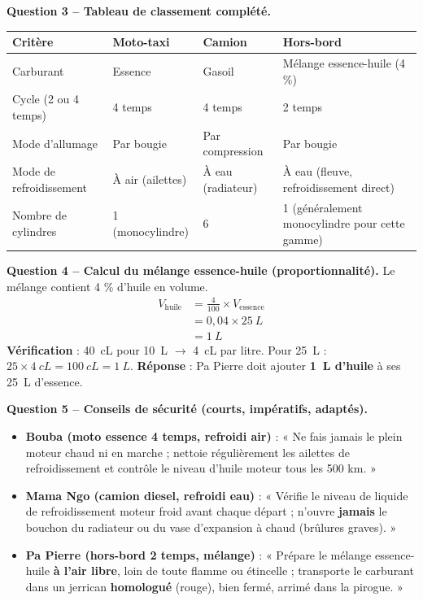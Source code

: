 \documentclass[11pt]{article}
\begin{document}
\begin{exoresolu}
\textbf{Question 3 -- Tableau de classement complété.}
\begin{center}
\begin{tabularx}{\linewidth}{|l|X|X|X|}
\hline
\rowcolor{popblueL} \textbf{Critère} & \textbf{Moto-taxi} & \textbf{Camion} & \textbf{Hors-bord} \\
\hline
Carburant & Essence & Gasoil & Mélange essence-huile (4 \%) \\
\hline
Cycle (2 ou 4 temps) & 4 temps & 4 temps & 2 temps \\
\hline
Mode d'allumage & Par bougie & Par compression & Par bougie \\
\hline
Mode de refroidissement & À air (ailettes) & À eau (radiateur) & À eau (fleuve, refroidissement direct) \\
\hline
Nombre de cylindres & 1 (monocylindre) & 6 & 1 (généralement monocylindre pour cette gamme) \\
\hline
\end{tabularx}
\end{center}

\textbf{Question 4 -- Calcul du mélange essence-huile (proportionnalité).}
Le mélange contient 4 \% d'huile en volume.
\begin{align*}
V_{\text{huile}} &= \frac{4}{100} \times V_{\text{essence}} \\
&= 0{,}04 \times \SI{25}{L} \\
&= \SI{1}{L}
\end{align*}
\textbf{Vérification} : \SI{40}{cL} pour \SI{10}{L} $\rightarrow$ \SI{4}{cL} par litre. Pour \SI{25}{L} : $25 \times \SI{4}{cL} = \SI{100}{cL} = \SI{1}{L}$.
\textbf{Réponse} : Pa Pierre doit ajouter \textbf{\SI{1}{L} d'huile} à ses \SI{25}{L} d'essence.

\textbf{Question 5 -- Conseils de sécurité (courts, impératifs, adaptés).}
\begin{itemize}
\item \textbf{Bouba (moto essence 4 temps, refroidi air)} : « Ne fais jamais le plein moteur chaud ni en marche ; nettoie régulièrement les ailettes de refroidissement et contrôle le niveau d'huile moteur tous les 500 km. »
\item \textbf{Mama Ngo (camion diesel, refroidi eau)} : « Vérifie le niveau de liquide de refroidissement moteur froid avant chaque départ ; n'ouvre \textbf{jamais} le bouchon du radiateur ou du vase d'expansion à chaud (brûlures graves). »
\item \textbf{Pa Pierre (hors-bord 2 temps, mélange)} : « Prépare le mélange essence-huile \textbf{à l'air libre}, loin de toute flamme ou étincelle ; transporte le carburant dans un jerrican \textbf{homologué} (rouge), bien fermé, arrimé dans la pirogue. »
\end{itemize}


\end{exoresolu}
\end{document}
